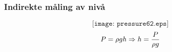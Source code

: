 \documentclass[aspectratio=169,xcolor=dvipsnames]{beamer}
\begin{document}
%
%
%
%
%
%
%
%
%
%
\begin{frame}
	\frametitle{Indirekte måling av nivå}

	$$\texttt{[image: pressure62.eps]}$$
$$P = \rho g h \Rightarrow h = {P \over {\rho g}}$$
\end{frame}
\end{document}
